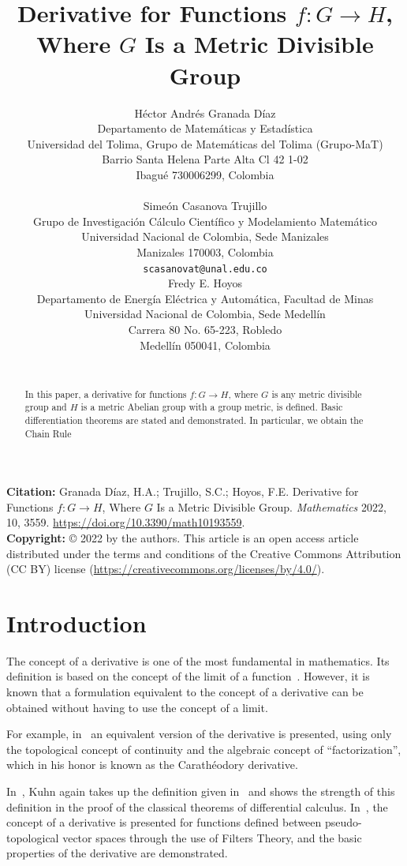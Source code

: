 \documentclass{article}
\title{Derivative for Functions $f : G \to H$, Where $G$ Is a Metric Divisible Group}
\author{
H\'ector Andr\'es Granada D\'iaz \\
Departamento de Matem\'aticas y Estad\'istica\\
Universidad del Tolima, Grupo de Matem\'aticas del Tolima (Grupo-MaT)\\
Barrio Santa Helena Parte Alta Cl 42 1-02\\
Ibagu\'e 730006299, Colombia\\
\texttt{ }\\
\And
Sime\'on Casanova Trujillo\\
Grupo de Investigaci\'on C\'alculo Cient\'ifico y Modelamiento Matem\'atico\\
Universidad Nacional de Colombia, Sede Manizales\\
Manizales 170003, Colombia\\
\texttt{scasanovat@unal.edu.co}\\
\And
Fredy E. Hoyos\\
Departamento de Energ\'ia El\'ectrica y Autom\'atica, Facultad de Minas\\
Universidad Nacional de Colombia, Sede Medell\'in\\
Carrera 80 No. 65-223, Robledo\\
Medell\'in 050041, Colombia\\
\texttt{ }
}
\numberwithin{theorem}{section}
\numberwithin{equation}{section}
\begin{document}
\maketitle


\noindent\textbf{Citation:} Granada D\'iaz, H.A.; Trujillo, S.C.; Hoyos, F.E. Derivative for Functions $f : G \to H$, Where $G$ Is a Metric Divisible Group. \textit{Mathematics} 2022, 10, 3559. \url{https://doi.org/10.3390/math10193559}.\\[0.3em]
\noindent\textbf{Copyright:} \copyright{} 2022 by the authors. This article is an open access article distributed under the terms and conditions of the Creative Commons Attribution (CC BY) license (\url{https://creativecommons.org/licenses/by/4.0/}).\\

\begin{abstract}
In this paper, a derivative for functions $f : G \to H$, where $G$ is any metric divisible group and $H$ is a metric Abelian group with a group metric, is defined. Basic differentiation theorems are stated and demonstrated. In particular, we obtain the Chain Rule
\end{abstract}



\section{Introduction}

The concept of a derivative is one of the most fundamental in mathematics. Its definition is based on the concept of the limit of a function~\cite{botsko1985}. However, it is known that a formulation equivalent to the concept of a derivative can be obtained without having to use the concept of a limit. 

For example, in~\cite{caratheodory1954} an equivalent version of the derivative is presented, using only the topological concept of continuity and the algebraic concept of ``factorization'', which in his honor is known as the Carathéodory derivative.

In~\cite{kuhn1991}, Kuhn again takes up the definition given in~\cite{caratheodory1954} and shows the strength of this definition in the proof of the classical theorems of differential calculus. In~\cite{frolicher1966}, the concept of a derivative is presented for functions defined between pseudo-topological vector spaces through the use of Filters Theory, and the basic properties of the derivative are demonstrated.
\end{document}

